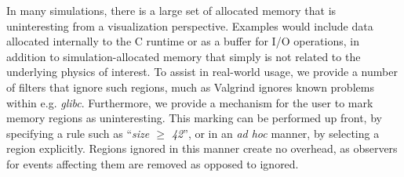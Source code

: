 In many simulations, there is a large set of allocated memory that
is uninteresting from a visualization perspective.  Examples would
include data allocated internally to the C runtime or as a buffer for
I/O operations, in addition to simulation-allocated memory that simply
is not related to the underlying physics of interest.  To assist in
real-world usage, we provide a number of filters that ignore such
regions, much as Valgrind ignores known problems within e.g.
\textit{glibc}.  Furthermore, we provide a mechanism for the user to
mark memory regions as uninteresting.  This marking can be performed up
front, by
specifying a rule such as ``\textit{size $\geq$ 42}'', or in an
\textit{ad hoc} manner, by selecting a region explicitly.  Regions
ignored in this manner create no overhead, as observers for events
affecting them are removed as opposed to ignored.






